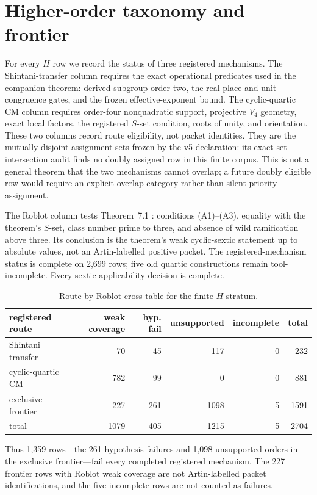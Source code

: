 \documentclass[11pt]{article}
\begin{document}
\section{Higher-order taxonomy and frontier}

For every $H$ row we record the status of three registered mechanisms.
The Shintani-transfer column requires the exact operational predicates
used in the companion theorem: derived-subgroup order two, the
real-place and unit-congruence gates, and the frozen effective-exponent
bound.  The cyclic-quartic CM column requires order-four nonquadratic
support, projective $V_4$ geometry, exact local factors, the registered
$S$-set condition, roots of unity, and orientation.  These two columns
record route eligibility, not packet identities.  They are the
mutually disjoint assignment sets frozen by the v5 declaration: its
exact set-intersection audit finds no doubly assigned row in this
finite corpus.  This is not a general theorem that the two mechanisms
cannot overlap; a future doubly eligible row would require an explicit
overlap category rather than silent priority assignment.

The Roblot column tests Theorem~7.1 \cite{Roblot2013}: conditions
(A1)--(A3), equality with the theorem's $S$-set, class number prime to
three, and absence of wild ramification above three.  Its conclusion is
the theorem's weak cyclic-sextic statement up to absolute values, not an
Artin-labelled positive packet.  The registered-mechanism status is
complete on 2,699 rows; five old quartic constructions remain
tool-incomplete.  Every sextic applicability decision is complete.

\begin{table}[ht]
\centering
\caption{Route-by-Roblot cross-table for the finite $H$ stratum.}
\label{tab:higher}
\begin{tabular}{lrrrrr}\toprule
registered route & weak coverage & hyp. fail & unsupported & incomplete & total\\\midrule
Shintani transfer & 70 & 45 & 117 & 0 & 232\\
cyclic-quartic CM & 782 & 99 & 0 & 0 & 881\\
exclusive frontier & 227 & 261 & 1098 & 5 & 1591\\\midrule
total & 1079 & 405 & 1215 & 5 & 2704\\\bottomrule
\end{tabular}
\end{table}

Thus 1,359 rows---the 261 hypothesis failures and 1,098 unsupported
orders in the exclusive frontier---fail every completed registered
mechanism.  The 227 frontier rows with Roblot weak coverage are not
Artin-labelled packet identifications, and the five incomplete rows are
not counted as failures.
\end{document}
